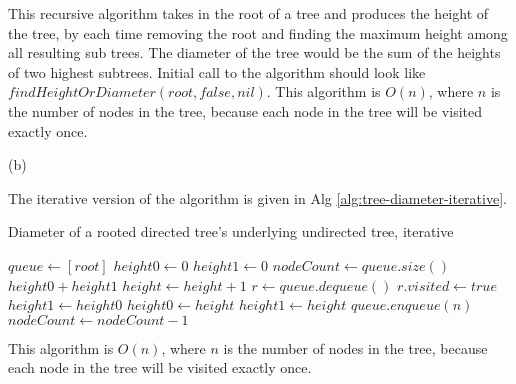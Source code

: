 \documentclass{article}
\begin{document}
\begin{description}
  This recursive algorithm takes in the root of a tree and produces the height of the tree, by each time removing the root and finding the maximum height among all resulting sub trees. The diameter of the tree would be the sum of the heights of two highest subtrees. Initial call to the algorithm should look like $findHeightOrDiameter(root, false, nil)$. This algorithm is $O(n)$, where $n$ is the number of nodes in the tree, because each node in the tree will be visited exactly once.

  (b)

  The iterative version of the algorithm is given in Alg \ref{alg:tree-diameter-iterative}.

  \begin{algorithm}[h]
  \caption{Diameter of a rooted directed tree's underlying undirected tree, iterative}
  \label{alg:tree-diameter-iterative}
    \begin{algorithmic}[1]
      \State $queue \gets [root]$
      \State $height0 \gets 0$
      \State $height1 \gets 0$
        \State $nodeCount \gets queue.size()$
          \State \Return $height0 + height1$
        \EndIf
        \State $height \gets height + 1$
          \State $r \gets queue.dequeue()$
          \State $r.visited \gets true$
              \State $height1 \gets height0$
              \State $height0 \gets height$
              \State $height1 \gets height$
            \EndIf
          \Else
              \State $queue.enqueue(n)$
            \EndFor
          \EndIf
          \State $nodeCount \gets nodeCount - 1$
        \EndWhile
      \EndWhile
    \EndFunction
    \end{algorithmic}
  \end{algorithm}

  This algorithm is $O(n)$, where $n$ is the number of nodes in the tree, because each node in the tree will be visited exactly once.

\end{description}
\end{document}
